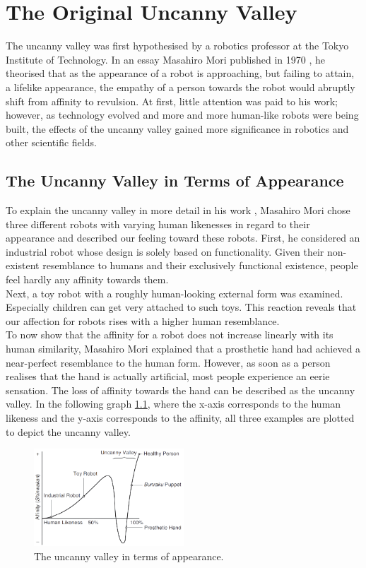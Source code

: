 \chapter{The Original Uncanny Valley}
The uncanny valley was first hypothesised by a robotics professor at the Tokyo Institute of Technology. In an essay Masahiro Mori published in 1970 \cite{original_masahiro_not_translated}, he theorised that as the appearance of a robot is approaching, but failing to attain, a lifelike appearance, the empathy of a person towards the robot would abruptly shift from affinity to revulsion.
At first, little attention was paid to his work; however, as technology evolved and more and more human-like robots were being built, the effects of the uncanny valley gained more significance in robotics and other scientific fields. 

\section{The Uncanny Valley in Terms of Appearance}
To explain the uncanny valley in more detail in his work \cite{original_masahiro}, Masahiro Mori chose three different robots with varying human likenesses in regard to their appearance and described our feeling toward these robots. First, he considered an industrial robot whose design is solely based on functionality. Given their non-existent resemblance to humans and their exclusively functional existence, people feel hardly any affinity towards them.\\
Next, a toy robot with a roughly human-looking external form was examined. Especially children can get very attached to such toys. This reaction reveals that our affection for robots rises with a higher human resemblance.\\
To now show that the affinity for a robot does not increase linearly with its human similarity, Masahiro Mori explained that a prosthetic hand had achieved a near-perfect resemblance to the human form. However, as soon as a person realises that the hand is actually artificial, most people experience an eerie sensation. The loss of affinity towards the hand can be described as the uncanny valley.
In the following graph \ref{fig:uv_appearance}, where the x-axis corresponds to the human likeness and the y-axis corresponds to the affinity, all three examples are plotted to depict the uncanny valley. 
\begin{figure} %
    \centering
    \includegraphics[width=0.5\textwidth]{graphics/uv_appearance.png}
    \caption{The uncanny valley in terms of appearance.}
    \label{fig:uv_appearance}
\end{figure}
